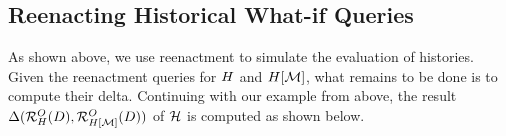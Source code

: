 
\subsection{Reenacting Historical What-if Queries}
\label{sec:answ-hist-what}

As shown above, we use reenactment to simulate the evaluation of histories. Given the reenactment queries for $H$ and $H[\mathcal{M}]$, what remains to be done is to compute their delta.
Continuing with our example from above, the result $\Delta(\mathcal{R}^{O}_{H}(D),\mathcal{R}^{O}_{H[\mathcal{M}]}(D))$ of $\mathcal{H}$ is computed as shown below.


